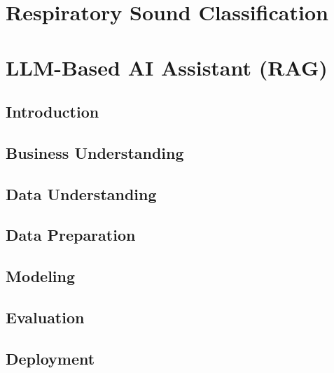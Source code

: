 \documentclass[12pt]{report}
\begin{document}
\setcounter{chapter}{3}
\setcounter{section}{0}
\chapter{Respiratory Sound Classification}








\chapter{LLM-Based AI Assistant (RAG)} %
\label{chap:llm-rag}

\section*{Introduction}

\pagebreak  %



\section{Business Understanding} %

\section{Data Understanding} %

\section{Data Preparation} %

\section{Modeling} %

\section{Evaluation} %

\section{Deployment} %

\end{document}
